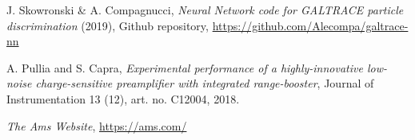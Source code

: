 \begin{thebibliography}{20}
  J. Skowronski \& A. Compagnucci,
  \emph{Neural Network code for GALTRACE particle discrimination} (2019), Github repository, \url{https://github.com/Alecompa/galtrace-nn}

  A. Pullia and S. Capra,
  \emph{Experimental performance of a highly-innovative low-noise charge-sensitive preamplifier with integrated range-booster}, Journal of Instrumentation 13 (12), art. no. C12004, 2018.

  \emph{The Ams Website}, \url{https://ams.com/}

\end{thebibliography}
